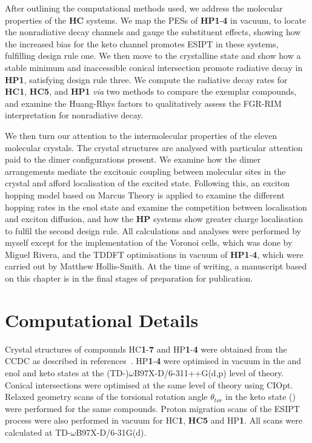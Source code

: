 After outlining the computational methods used, we address the molecular properties of the \textbf{HC} systems. We map the \acp{PES} of \textbf{HP1}-\textbf{4} in vacuum, to locate the nonradiative decay channels and gauge the substituent effects, showing how the increased bias for the keto channel promotes \ac{ESIPT} in these systems, fulfilling design rule one. We then move to the crystalline state and show how a stable \Kstar{} minimum and inaccessible conical intersection promote radiative decay in \textbf{HP1}, satisfying design rule three. We compute the radiative decay rates for \textbf{HC1}, \textbf{HC5}, and \textbf{HP1} \textit{via} two methods to compare the exemplar compounds, and examine the Huang-Rhys factors to qualitatively assess the \ac{FGR-RIM} interpretation for nonradiative decay.

We then turn our attention to the intermolecular properties of the eleven molecular crystals. The crystal structures are analysed with particular attention paid to the dimer configurations present. We examine how the dimer arrangements mediate the excitonic coupling between molecular sites in the crystal and afford localisation of the excited state. Following this, an exciton hopping model based on Marcus Theory is applied to examine the different hopping rates in the enol state and examine the competition between localisation and exciton diffusion, and how the \textbf{HP} systems show greater charge localisation to fulfil the second design rule.  All calculations and analyses were performed by myself except for the implementation of the Voronoi cells, which was done by Miguel Rivera, and the TDDFT optimisations in vacuum of \textbf{HP1}-\textbf{4}, which were carried out by Matthew Hollis-Smith. At the time of writing, a manuscript based on this chapter is in the final stages of preparation for publication.

\section{Computational Details}\label{section: Connecting_Comp}
Crystal structures of compounds \ac{HC}\textbf{1}-\textbf{7} and \ac{HP}\textbf{1}-\textbf{4} were obtained from the CCDC as described in references{~}. \ac{HP}\textbf{1}-\textbf{4} were optimised in vacuum in the \szero{} and \sone{} enol and keto states at the (TD-)$\omega$B97X-D/6-311++G(d,p) level of theory. Conical intersections were optimised at the same level of theory using CIOpt.\cite{Levine2008} Relaxed geometry scans of the torsional rotation angle $\theta_{tor}$ in the keto \sone{} state (\Kstar) were performed for the same compounds. Proton migration scans of the ESIPT process were also performed in vacuum for \ac{HC}\textbf{1}, \textbf{HC5} and \ac{HP}\textbf{1}. All scans were calculated at TD-$\omega$B97X-D/6-31G(d). 

